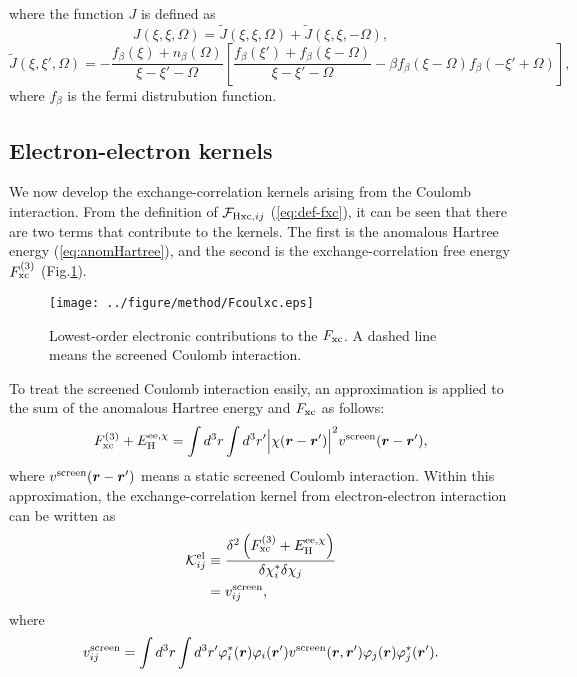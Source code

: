 %
where the function $J$ is defined as
%
\begin{equation}
	J(\xi, \xi, \Omega) = \tilde{J}(\xi, \xi, \Omega) + \tilde{J}(\xi, \xi, -\Omega), 
	\label{eq:Jfunc}
\end{equation}
%
\begin{equation}
	\tilde{J}(\xi, \xi', \Omega) = 
	- \frac{f_\beta(\xi) + n_\beta(\Omega)}{\xi-\xi'-\Omega}
	\left[
		\frac{f_\beta(\xi') + f_\beta(\xi-\Omega)}{\xi-\xi'-\Omega} -
		\beta f_\beta(\xi-\Omega) f_\beta(-\xi'+\Omega)
	\right],
	\label{eq:Jtildefunc}
\end{equation}
%
where $f_{\beta}$ is the fermi distrubution function.
%
%
\subsection*{Electron-electron kernels}
%
We now develop the exchange-correlation kernels arising from the Coulomb interaction.
From the definition of ${\mathcal F}_{{\rm Hxc},ij}$ (\ref{eq:def-fxc}), it can be seen that
there are two terms that contribute to the kernels. The first is the anomalous Hartree energy (\ref{eq:anomHartree}), 
and the second is the exchange-correlation free energy $F^{(3)}_{\rm xc}$ (Fig.\ref{fig:Fcoulxc}).
%
\begin{figure} %
	\centering
	\texttt{[image: ../figure/method/Fcoulxc.eps]}
	\caption{Lowest-order electronic contributions to the $F_{\rm xc}$. A dashed line means the screened Coulomb interaction.}
	\label{fig:Fcoulxc}
\end{figure}
%
To treat the screened Coulomb interaction easily, an approximation is applied to the sum of the 
anomalous Hartree energy and $F_{\rm xc}$ as follows\cite{Luders2005}:
%
\begin{equation}
	F^{(3)}_{\rm xc} + E^{{\rm ee}, \chi}_{\rm H} = \int d^3r \int d^3r'
	\Big| \chi(\bm r - \bm r') \Big|^2 v^{\rm screen}(\bm r - \bm r'),
	\label{Fcoulxcapprox}
\end{equation}
%
where $v^{\rm screen}(\bm r - \bm r')$ means a static screened Coulomb interaction.
Within this approximation, the exchange-correlation kernel from electron-electron interaction
can be written as
%
\begin{equation}
	\label{eq:Kel}
\begin{split}
	{\mathcal K}^{\rm el}_{ij} &\equiv \frac{\delta^2 \left( F^{(3)}_{\rm xc} + E^{{\rm ee},\chi}_{\rm H} \right)}
	{\delta \chi^\ast_i \delta\chi_j} \\
	& = v^{\rm screen}_{ij},
\end{split}
\end{equation}
%
where
%
\begin{equation}
	v^{\rm screen}_{ij} = \int d^3r \int d^3r' \varphi^\ast_i(\bm r)\varphi_i({\bm r'})
	v^{\rm screen}(\bm r, {\bm r'}) \varphi_j(\bm r) \varphi^\ast_j({\bm r'}).
	\label{eq:Keldef}
\end{equation}
%

